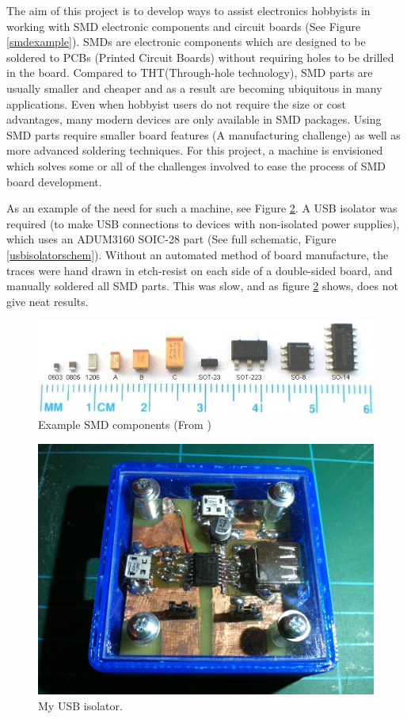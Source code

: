 The aim of this project is to develop ways to assist electronics hobbyists in working with SMD electronic components
and circuit boards (See Figure \ref{smdexample}). \gls{SMD}s are electronic components which are designed to be soldered to \gls{PCB}s
(Printed Circuit Boards) without requiring holes to be drilled in the board. Compared to \gls{THT}(Through-hole technology), SMD parts 
are usually smaller and cheaper and as a result are becoming ubiquitous in many applications. Even when hobbyist users do
not require the size or cost advantages, many modern devices are only available in SMD packages. Using SMD parts require
smaller board features (A manufacturing challenge) as well as more advanced soldering techniques. For this project, a machine
is envisioned which solves some or all of the challenges involved to ease the process of SMD board development.

\vspace{0.5cm}
As an example of the need for such a machine, see Figure \ref{usbisolator}. A USB isolator was required (to make USB connections to devices with non-isolated
power supplies), which uses an ADUM3160 SOIC-28 part (See full schematic, Figure \ref{usbisolatorschem}). Without an automated method of board manufacture, the
traces were hand drawn in etch-resist on each side of a double-sided board, and manually soldered all SMD parts. This was slow, and as figure \ref{usbisolator} shows, does not give
neat results.


\begin{figure}[ht!]
\centering
\includegraphics[width=150mm]{resources/SMDsizes.jpg}
\caption{Example SMD components (From \cite{fpga4fun})}
\label{overflow}
\end{figure}

\begin{figure}[ht!]
\centering
\includegraphics[width=120mm]{resources/usbisolator.jpg}
\caption{My USB isolator.}
\label{usbisolator}
\end{figure}

